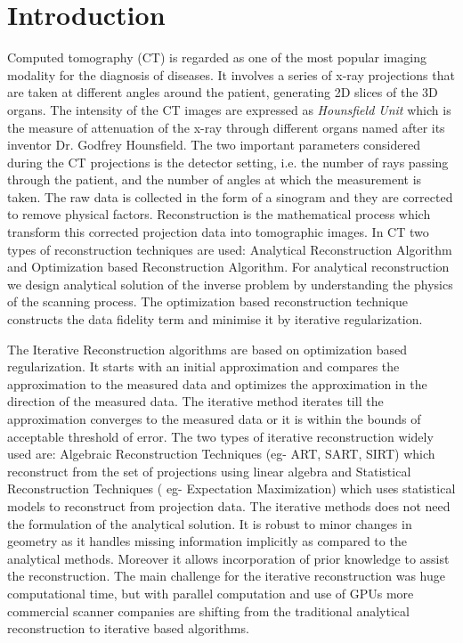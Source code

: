 \documentclass[12pt]{article}
\newcommand{\noin}{\noindent}
\begin{document}
	\section{Introduction}
	\noin Computed tomography (CT) is regarded as one of the most popular imaging modality for the diagnosis of diseases. It involves a series of x-ray projections that are taken at different angles around the patient, generating 2D slices of the 3D organs. The intensity  of the CT images are expressed as \emph{Hounsfield Unit} which is the measure of attenuation of the x-ray through different organs named after its inventor Dr. Godfrey Hounsfield. The two important parameters considered during the CT projections is the detector setting, i.e. the number of rays passing through the patient, and the number of angles at which the measurement is taken. The raw data is collected in the form of a sinogram and they are corrected to remove physical factors. Reconstruction is the mathematical process which transform this corrected projection data into tomographic images. In CT two types of reconstruction techniques are used: Analytical Reconstruction Algorithm and Optimization based Reconstruction Algorithm. For analytical reconstruction we design analytical solution of the inverse problem by understanding the physics of the scanning process. The optimization based reconstruction technique constructs the data fidelity term and minimise it by iterative regularization. 
	
	\vspace{0.2in}
	
	\noin The Iterative Reconstruction algorithms are based on optimization based regularization. It starts with an initial approximation and compares the approximation to the measured data and optimizes the approximation in the direction of the measured data. The iterative method iterates till the approximation converges to the measured data or it is within the bounds of acceptable threshold of error. The two types of iterative reconstruction widely used are: Algebraic Reconstruction Techniques (eg- ART, SART, SIRT) which reconstruct from the set of projections using linear algebra and Statistical Reconstruction Techniques ( eg- Expectation Maximization) which uses statistical models to reconstruct from projection data. The iterative methods does not need the formulation of the analytical solution. It is robust to minor changes in geometry as it handles missing information implicitly as compared to the analytical methods. Moreover it allows incorporation of prior knowledge to assist the reconstruction. The main challenge for the iterative reconstruction was huge computational time, but with parallel computation and use of GPUs more commercial scanner companies are shifting from the traditional analytical reconstruction to iterative based algorithms.
	
\end{document}
